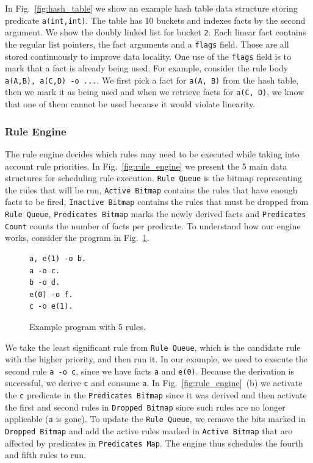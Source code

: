 In Fig.~\ref{fig:hash_table} we show an example hash table data structure storing predicate \texttt{a(int,int)}. The table
has 10 buckets and indexes facts by the second argument. We show the doubly linked list for bucket \texttt{2}. Each linear fact
contains the regular list pointers, the fact arguments and a \texttt{flags} field. Those are all stored continuously to improve data
locality. One use of the \texttt{flags} field is to mark that a fact is already being used. For example,
consider the rule body \texttt{a(A,B), a(C,D) -o ...}. We first pick a fact for \texttt{a(A, B)} from the hash table, then we mark it as
being used and when we retrieve facts for \texttt{a(C, D)}, we know that one of them cannot be used because it would
violate linearity.

\subsubsection{Rule Engine}\label{rule_engine}

The rule engine decides which rules may need to be executed while taking into account rule priorities.
In Fig.~\ref{fig:rule_engine} we present the 5 main data structures for scheduling rule execution.
\texttt{Rule Queue} is the bitmap representing the rules that will be run, \texttt{Active Bitmap} contains the rules that have enough
facts to be fired, \texttt{Inactive Bitmap} contains the rules that must be dropped from \texttt{Rule Queue}, \texttt{Predicates Bitmap}
marks the newly derived facts and \texttt{Predicates Count} counts the number of facts per predicate.
To understand how our engine works, consider
the program in Fig.~\ref{code:5rules}.

\begin{figure}
\vspace{-0.5\intextsep}
\footnotesize\begin{Verbatim}
a, e(1) -o b.
a -o c.
b -o d.
e(0) -o f.
c -o e(1).
\end{Verbatim}
\vspace{-.5\intextsep}
\caption{\small{Example program with 5 rules.}}
\label{code:5rules}
\vspace{-0.8\intextsep}
\end{figure}

We take the least significant rule from \texttt{Rule Queue}, which is the candidate rule with the higher priority, and then run it. In our example, we need to execute the second rule \texttt{a -o c}, since we have facts \texttt{a} and \texttt{e(0)}.
Because the derivation is successful, we derive \texttt{c} and consume \texttt{a}. In Fig.~\ref{fig:rule_engine}~(b) we
activate the \texttt{c} predicate in the \texttt{Predicates Bitmap} since it was derived and then activate the first and second rules
in \texttt{Dropped Bitmap} since such rules are no longer applicable (\texttt{a} is gone). To update the \texttt{Rule Queue},
we remove the bits marked in \texttt{Dropped Bitmap} and add the active rules marked in \texttt{Active Bitmap} that are affected
by predicates in \texttt{Predicates Map}. The engine thus schedules the fourth and fifth rules to run.


